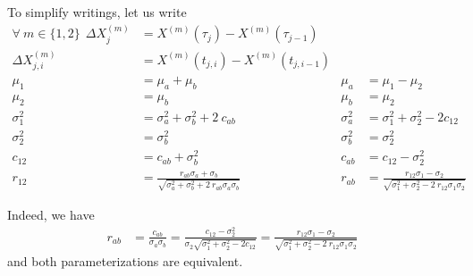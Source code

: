 To simplify writings, let us write 
\begin{align*}
\forall \ m \in\{1,2\} \ \ \Delta X^{(m)}_j &= X^{(m)}(\tau_j)- X^{(m)}(\tau_{j-1})\\
\Delta X^{(m)}_{j,i} &= X^{(m)}(t_{j,i})- X^{(m)}(t_{j,i-1})\\
\mu_1&=\mu_a +\mu_b  &  \mu_a&=\mu_1-\mu_2\\
\mu_2&= \mu_b  & \mu_b& =\mu_2\\
\sigma_1^2&=\sigma_a^2+\sigma_b^2+2\ c_{ab}  &\sigma_a^2&= \sigma_1^2+\sigma_2^2-2c_{12}\\
\sigma_2^2&=\sigma_b^2  & \sigma_b^2&=\sigma_2^2 \\
c_{12}&= c_{ab} + \sigma_b^2  & c_{ab} &=c_{12}-\sigma_2^2\\
r_{12}&=\frac{r_{ab} \sigma_a +\sigma_b}{\sqrt{\sigma_a^2+\sigma_b^2+2\ r_{ab} \sigma_a \sigma_b}} & r_{ab} &=\frac{ r_{12} \sigma_1   -\sigma_2}{\sqrt{\sigma_1^2+\sigma_2^2-2 \ r_{12} \sigma_1 \sigma_2}}
\end{align*}


Indeed, we have 
\begin{align*}
r_{ab}&=\frac{c_{ab}}{\sigma_a \sigma_b}
=\frac{c_{12}-\sigma_2^2}{\sigma_2 \sqrt{\sigma_1^2+\sigma_2^2-2 c_{12}}}
=\frac{r_{12}\sigma_1-\sigma_2}{\sqrt{\sigma_1^2+\sigma_2^2-2 \ r_{12} \sigma_1 \sigma_2}}
\end{align*}
and both parameterizations are equivalent.




